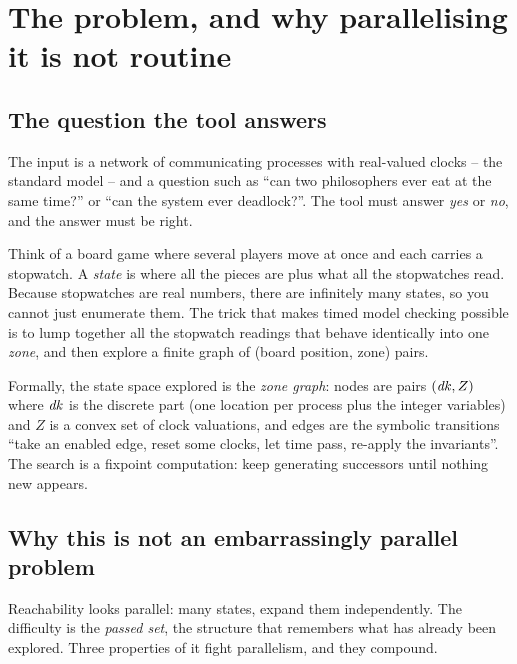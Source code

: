 \section{The problem, and why parallelising it is not routine}
\label{sec:problem}

\subsection{The question the tool answers}

The input is a network of communicating processes with real-valued clocks --
the standard \uppaal{} model -- and a question such as ``can two philosophers
ever eat at the same time?'' or ``can the system ever deadlock?''.  The tool
must answer \emph{yes} or \emph{no}, and the answer must be right.

\begin{intuition}
Think of a board game where several players move at once and each carries a
stopwatch.  A \emph{state} is where all the pieces are plus what all the
stopwatches read.  Because stopwatches are real numbers, there are infinitely
many states, so you cannot just enumerate them.  The trick that makes timed
model checking possible is to lump together all the stopwatch readings that
behave identically into one \emph{zone}, and then explore a finite graph of
(board position, zone) pairs.
\end{intuition}

Formally, the state space explored is the \emph{zone graph}: nodes are pairs
$(\mathit{dk}, Z)$ where $\mathit{dk}$ is the discrete part (one location per process plus the
integer variables) and $Z$ is a convex set of clock valuations, and edges are
the symbolic transitions ``take an enabled edge, reset some clocks, let time
pass, re-apply the invariants''.  The search is a fixpoint computation: keep
generating successors until nothing new appears.

\subsection{Why this is not an embarrassingly parallel problem}

Reachability looks parallel: many states, expand them independently.  The
difficulty is the \emph{passed set}, the structure that remembers what has
already been explored.  Three properties of it fight parallelism, and they
compound.

